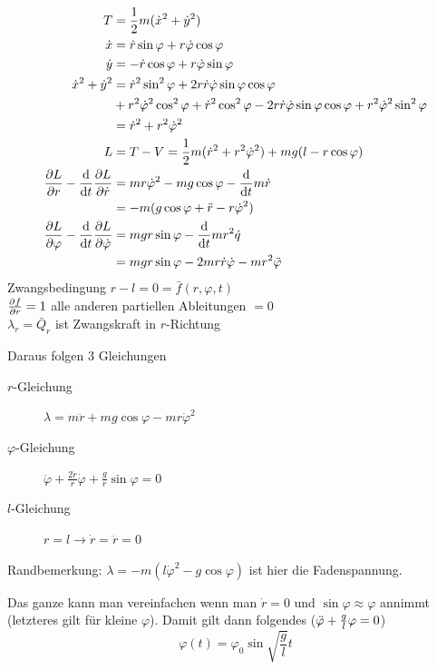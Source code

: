 \begin{beispiel*}
\begin{align*}
T &= \frac12 m (\dot{x}^2 + \dot{y}^2)\\
\dot{x} &= \dot{r} \sin \varphi + r \dot{\varphi} \cos \varphi\\
\dot{y} &= - \dot{r} \cos \varphi + r \dot{\varphi} \sin \varphi\\
\dot{x}^2 + \dot{y}^2 &= \dot{r}^2 \sin^2 \varphi + 2 r \dot{r} \dot\varphi \sin \varphi \cos \varphi \\
&+ r^2 \dot{\varphi}^2 \cos^2 \varphi + \dot{r}^2 \cos^2 \varphi - 2 r \dot r \dot \varphi \sin \varphi \cos \varphi + r^2 \dot{\varphi}^2 \sin^2 \varphi \\
&= \dot{r}^2 + r^2 \dot{\varphi}^2\\
L &= T-V = \frac12 m (\dot{r}^2 + r^2 \dot{\varphi}^2) + mg(l - r \cos \varphi)\\
\frac{\partial L}{\partial r} - \frac{\mathrm d}{\mathrm d t} \frac{\partial L}{\partial \dot{r}} &= m r \dot{\varphi}^2 - mg \cos \varphi - \frac{\mathrm d}{\mathrm d t} m \dot{r} \\
&= -m (g \cos \varphi + \ddot{r} - r \dot{\varphi}^2)\\
\frac{\partial L}{\partial \varphi} - \frac{\mathrm d}{\mathrm d t} \frac{\partial L}{\partial \dot{\varphi}} &= mgr \sin \varphi - \frac{\mathrm d}{\mathrm d t} m r^2 \dot{q} \\
&= mgr \sin \varphi - 2mr\dot{r}\dot{\varphi} - mr^2 \ddot{\varphi}\\
\end{align*}
Zwangsbedingung $r-l = 0 = \bar{f}(r, \varphi, t)$\\
$\frac{\partial f}{\partial r} = 1$ alle anderen partiellen Ableitungen $= 0$\\
\conseq $\lambda_r = \bar{Q}_r$ ist Zwangskraft in $r$-Richtung

Daraus folgen 3 Gleichungen
\begin{description}
	\item[$r$-Gleichung] $\lambda = m \ddot{r} + mg \cos \varphi - m r \dot{\varphi}^2$
	\item[$\varphi$-Gleichung] $\ddot{\varphi} + \frac{2 \dot{r}}{r} \dot{\varphi} + \frac{g}{r} \sin \varphi = 0$
	\item[$l$-Gleichung] $r = l \rightarrow \dot{r} = \ddot{r} = 0$
\end{description}
Randbemerkung: $\lambda = -m(l \dot{\varphi}^2 - g \cos \varphi)$ ist hier die Fadenspannung.

Das ganze kann man vereinfachen wenn man $\dot{r} = 0$ und $\sin \varphi \approx \varphi$ annimmt (letzteres gilt für kleine $\varphi$). Damit gilt dann folgendes ($\ddot{\varphi} + \frac{g}{l} \varphi = 0$)
$$\varphi(t) = \varphi_0 \sin \sqrt{\frac{g}{l}} t$$
\end{beispiel*}

